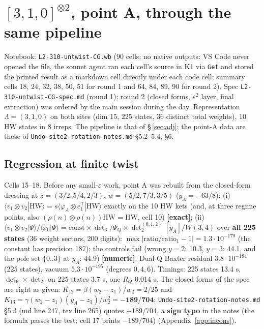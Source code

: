 \documentclass[10pt]{article}
\newcommand{\nb}[1]{\texttt{#1}}
\begin{document}
\section{$[3,1,0]^{\otimes2}$, point A, through the same pipeline}\label{sec:a310}

Notebook: \nb{L2-\allowbreak{}310-\allowbreak{}untwist-\allowbreak{}CG.\allowbreak{}wb} (90 cells; no native outputs: VS Code never opened the file, the sonnet agent ran each cell's source in K1 via \nb{Get} and stored the printed result as a markdown cell directly under each code cell; summary cells 18, 24, 32, 38, 50, 51 for round 1 and 64, 84, 89, 90 for round 2). Spec \nb{L2-\allowbreak{}310-\allowbreak{}untwist-\allowbreak{}CG-\allowbreak{}spec.\allowbreak{}md} (round 1); round 2 (closed forms, $\varepsilon^2$ layer, final extraction) was ordered by the main session during the day. Representation $\Lambda=(3,1,0)$ on both sites (dim 15, 225 states, 36 distinct total weights), 10 HW states in 8 irreps. The pipeline is that of \S\,\ref{sec:adj}; the point-A data are those of \nb{Undo-\allowbreak{}site2-\allowbreak{}rotation-\allowbreak{}notes.\allowbreak{}md} \S{}5.2--5.4, \S{}6.

\subsection{Regression at finite twist}\label{sec:a310reg}

Cells 15--18. Before any small-$\varepsilon$ work, point A was rebuilt from the closed-form dressing at $z=(3/2,5/4,2/3)$, $w=(5/2,7/3,3/5)$ ($y_A=-63/8$): (i) $\langle v_1\otimes v_2|\mathrm{HW}\rangle=s\langle\varphi_A\otimes e_1^{\mathsf T}|\mathrm{HW}\rangle$ exactly on the 10 HW kets (and, at three regime points, also $(\rho(n)\otimes\rho(n))\mathrm{HW}=\mathrm{HW}$, cell 10) \textbf{[exact]}; (ii) $\langle v_1\otimes v_2|\Psi\rangle/\langle x_0|\Psi\rangle=\mathrm{const}\times\det_6/\Psi_Q\times\det_2^{(0,1,2)}[y_A]/W(3,4)$ over \textbf{all 225 states} (36 weight sectors, 200 digits): $\max|\mathrm{ratio}/\mathrm{ratio}_1-1|=1.3\cdot10^{-179}$ (the constant has precision 187); the controls fail (wrong $y=2$: 10.3, $y=3$: 44.1, and the pole set $\{0..3\}$ at $y_A$: 44.9) \textbf{[numeric]}. Dual-Q Baxter residual $3.8\cdot10^{-184}$ (225 states), vacuum $5.3\cdot10^{-195}$ (degrees $0,4,6$). Timings: 225 states 13.4 s, $\det_6\times\det_2$ on 225 states 3.7 s, one $R_Q$ 0.014 s. The closed forms of the spec are right as given: $K_{12}=\beta(w_2-z_1)/w_2=2/25$ and $K_{13}=\gamma(w_2-z_1)(y_A-z_3)/w_2^2=\mathbf{-189/704}$; \nb{Undo-\allowbreak{}site2-\allowbreak{}rotation-\allowbreak{}notes.\allowbreak{}md} \S{}5.3 (md line 247, tex line 265) quotes $+189/704$, a \textbf{sign typo} in the notes (the formula passes the test; cell 17 prints $-189/704$) (Appendix~\ref{app:incons}).
\end{document}
